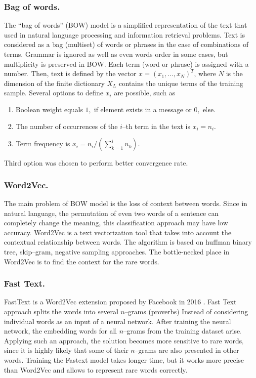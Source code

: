\documentclass[12pt]{jpconf}
\begin{document}
\subsubsection*{Bag of words.}
The ``bag of words'' (BOW) model is a simplified representation of the text that used in natural language processing and information retrieval problems. Text is considered as a bag (multiset) of words or phrases in the case of combinations of terms. Grammar is ignored as well as even words order in some cases, but multiplicity is preserved in BOW. Each term (word or phrase) is assigned with a number. Then, text is defined by the vector $x=(x_1,..., x_N)^T$, where $N$ is the dimension of the finite dictionary $X_L$ contains the unique terms of the training sample. Several options to define $x_i$ are possible, such as
\begin{enumerate}
\item Boolean weight equals $1,$ if element exists in a message or 
$0,$ else.
\item The number of occurrences of the $i$--th term in the text is 
$x_i = n_i.$
\item Term frequency is $x_i = n_i\slash\left(\sum\limits_{k=1}^i n_k\right).$
\end{enumerate}
Third option was chosen to perform better convergence rate.

\subsubsection*{Word2Vec.}
The main problem of BOW model is the loss of context between words. Since in natural language, the permutation of even two words of a sentence can completely change the meaning, this classification approach may have low accuracy.
Word2Vec is a text vectorization tool that takes into account the contextual relationship between words. The algorithm is based on huffman binary tree, skip--gram, negative sampling approaches. The bottle-necked place in Word2Vec is to find the context for the rare words.

\subsubsection*{Fast Text.}
FastText is a Word2Vec extension proposed by Facebook in 2016 \cite{Mikolov2013,Bojanowski2017}. Fast Text approach splits the words into several $n$--grams (proverbs) Instead of considering individual words as an input of a neural network. After training the neural network, the embedding words for all $n$--grams from the training dataset arise.
Applying such an approach, the solution becomes more sensitive to rare words, since it is highly likely that some of their $n$--grams are also presented in other words. Training the Fastext model takes longer time, but it works more precise than Word2Vec and allows to  represent rare words correctly.
\end{document}
